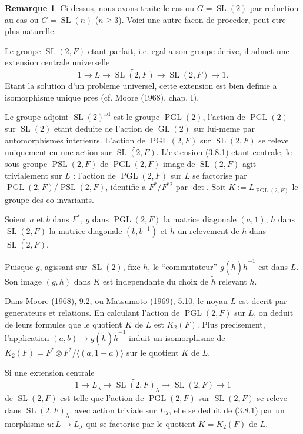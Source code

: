\documentclass[11pt,a4paper]{article}
\theoremstyle{plain}
\theoremstyle{definition}
\newtheorem{remark}[theorem]{Remarque}
\DeclareMathOperator{\PGL}{PGL}
\DeclareMathOperator{\PSL}{PSL}
\DeclareMathOperator{\SL}{SL}
\DeclareMathOperator{\GL}{GL}
\DeclareMathOperator{\ad}{ad}
\begin{document}
\begin{remark}\label{3.8}
Ci-dessus, nous avons traite le cas ou $G = \SL(2)$ par reduction au cas ou $G = \SL(n)$ ($n \geq 3$). Voici une autre facon de proceder, peut-etre plus naturelle.

Le groupe $\SL(2, F)$ etant parfait, i.e. egal a son groupe derive, il admet une extension centrale universelle
\begin{equation}\label{3.8.1}
1 \to L \to \widetilde{\SL(2, F)} \to \SL(2, F) \to 1.
\end{equation}
Etant la solution d'un probleme universel, cette extension est bien definie a isomorphisme unique pres (cf. Moore (1968), chap. I).

Le groupe adjoint $\SL(2)^{\ad}$ est le groupe $\PGL(2)$, l'action de $\PGL(2)$ sur $\SL(2)$ etant deduite de l'action de $\GL(2)$ sur lui-meme par automorphismes interieurs. L'action de $\PGL(2, F)$ sur $\SL(2, F)$ se releve uniquement en une action sur $\widetilde{\SL(2, F)}$. L'extension (3.8.1) etant centrale, le sous-groupe $\PSL(2, F)$ de $\PGL(2, F)$ image de $\SL(2, F)$ agit trivialement sur $L$ : l'action de $\PGL(2, F)$ sur $L$ se factorise par $\PGL(2, F)/\PSL(2, F)$, identifie a $F^*/F^{*2}$ par $\det$. Soit $K := L_{\PGL(2, F)}$ le groupe des co-invariants.

Soient $a$ et $b$ dans $F^*$, $g$ dans $\PGL(2, F)$ la matrice diagonale $(a, 1)$, $h$ dans $\SL(2, F)$ la matrice diagonale $(b, b^{-1})$ et $\tilde{h}$ un relevement de $h$ dans $\widetilde{\SL(2, F)}$.

Puisque $g$, agissant sur $\SL(2)$, fixe $h$, le ``commutateur'' $g(\tilde{h}) \tilde{h}^{-1}$ est dans $L$. Son image $(g, h)$ dans $K$ est independante du choix de $\tilde{h}$ relevant $h$.

Dans Moore (1968), 9.2, ou Matsumoto (1969), 5.10, le noyau $L$ est decrit par generateurs et relations. En calculant l'action de $\PGL(2, F)$ sur $L$, on deduit de leurs formules que le quotient $K$ de $L$ est $K_2(F)$. Plus precisement, l'application $(a, b) \mapsto g(\tilde{h}) \tilde{h}^{-1}$ induit un isomorphisme de $K_2(F) = F^* \otimes F^*/\langle (a, 1-a) \rangle$ sur le quotient $K$ de $L$.

Si une extension centrale
\begin{equation}\label{3.8.2}
1 \to L_\lambda \to \widetilde{\SL(2, F)}_\lambda \to \SL(2, F) \to 1
\end{equation}
de $\SL(2, F)$ est telle que l'action de $\PGL(2, F)$ sur $\SL(2, F)$ se releve dans $\widetilde{\SL(2, F)}_\lambda$, avec action triviale sur $L_\lambda$, elle se deduit de (3.8.1) par un morphisme $u : L \to L_\lambda$ qui se factorise par le quotient $K = K_2(F)$ de $L$.


\end{remark}
\end{document}
